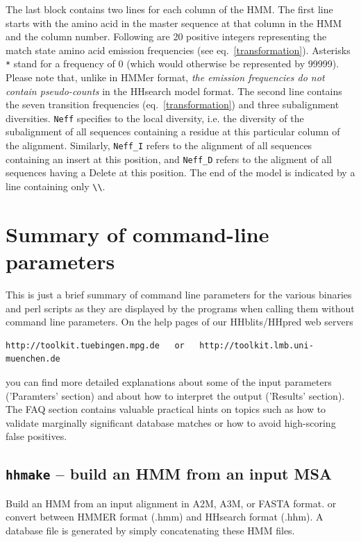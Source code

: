 \documentclass[11pt,a4paper]{article}
\begin{document}
The last block contains two lines for each column of the HMM. The first line starts with the amino acid in the master sequence at that column in the HMM and the column number. Following are 20  positive integers representing the match state amino acid emission frequencies (see eq.\ \ref{transformation}). Asterisks \verb`*` stand for a frequency of 0 (which would otherwise be represented by 99999). Please note that, unlike in HMMer format,  \emph{the emission frequencies do not contain pseudo-counts} in the HHsearch model format. The second line contains the seven transition frequencies (eq.\ \ref{transformation}) and three subalignment diversities. \verb`Neff` specifies to the local diversity, i.e. the diversity of the subalignment of all sequences containing a residue at this particular column of the alignment. Similarly, \verb`Neff_I` refers to the alignment of all sequences containing an insert at this position, and \verb`Neff_D` refers to the aligment of all sequences having a Delete at this position. The end of the model is indicated by a line containing only \verb`\\`. 

\newpage

\section{Summary of command-line parameters}

This is just a brief summary of command line parameters for the various binaries and
perl scripts as they are displayed by the programs when calling them without 
command line parameters. On the help pages of our HHblits/HHpred web servers
\begin{verbatim}
http://toolkit.tuebingen.mpg.de   or   http://toolkit.lmb.uni-muenchen.de
\end{verbatim}
you can find more detailed explanations about some of the input parameters 
('Paramters' section) and about how to interpret the output ('Results' section). The FAQ 
section contains valuable practical hints on topics such as how to validate marginally
significant database matches or how to avoid high-scoring false positives.

\subsection{{\tt hhmake} -- build an HMM from an input MSA}

Build an HMM from an input alignment in A2M, A3M, or FASTA format.   
or convert between HMMER format (.hmm) and HHsearch format (.hhm).   
A database file is generated by simply concatenating these HMM files.
\end{document}
